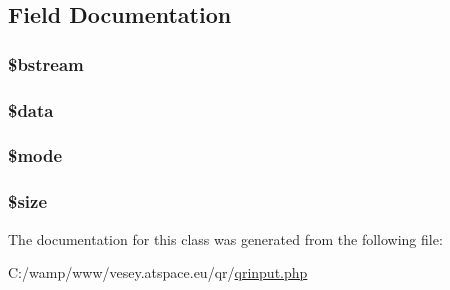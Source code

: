 \subsection{Field Documentation}
\hypertarget{class_q_rinput_item_a47bd4f599ed9040fc99add392968e3b0}{
\subsubsection[{\$bstream}]{\setlength{\rightskip}{0pt plus 5cm}\$bstream}}\label{class_q_rinput_item_a47bd4f599ed9040fc99add392968e3b0}
\hypertarget{class_q_rinput_item_a6efc15b5a2314dd4b5aaa556a375c6d6}{
\subsubsection[{\$data}]{\setlength{\rightskip}{0pt plus 5cm}\$data}}\label{class_q_rinput_item_a6efc15b5a2314dd4b5aaa556a375c6d6}
\hypertarget{class_q_rinput_item_a3aaf40baac36e278c7d7c9139df1750c}{
\subsubsection[{\$mode}]{\setlength{\rightskip}{0pt plus 5cm}\$mode}}\label{class_q_rinput_item_a3aaf40baac36e278c7d7c9139df1750c}
\hypertarget{class_q_rinput_item_af594986e4618a8d6a5d7566617f583c6}{
\subsubsection[{\$size}]{\setlength{\rightskip}{0pt plus 5cm}\$size}}\label{class_q_rinput_item_af594986e4618a8d6a5d7566617f583c6}


The documentation for this class was generated from the following file\-:\begin{DoxyCompactItemize}
\item 
C\-:/wamp/www/vesey.\-atspace.\-eu/qr/\hyperlink{qrinput_8php}{qrinput.\-php}\end{DoxyCompactItemize}

